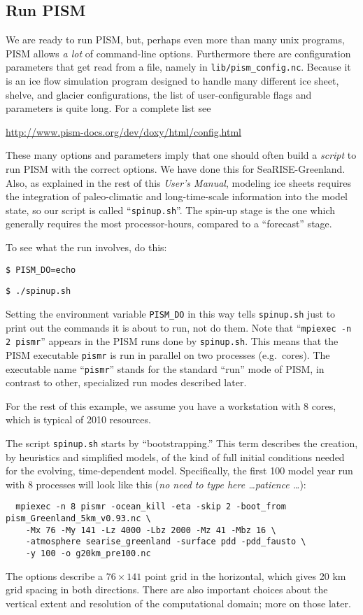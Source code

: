 \subsection{Run PISM}

We are ready to run PISM, but, perhaps even more than many unix programs, PISM allows \emph{a lot} of command-line options.  Furthermore there are configuration parameters that get read from a file, namely in \verb|lib/pism_config.nc|.  Because it is an ice flow simulation program designed to handle many different ice sheet, shelve, and glacier configurations, the list of user-configurable flags and parameters is quite long.  For a complete list see
\begin{center}
\url{http://www.pism-docs.org/dev/doxy/html/config.html}
\end{center}

These many options and parameters imply that one should often build a \emph{script} to run PISM with the correct options.  We have done this for SeaRISE-Greenland.  Also, as explained in the rest of this \emph{User's Manual}, modeling ice sheets requires the integration of paleo-climatic and long-time-scale information into the model state, so our script is called ``\verb|spinup.sh|''.  The spin-up stage is the one which generally requires the most processor-hours, compared to a ``forecast'' stage.

To see what the run involves, do this:

\verb|$ PISM_DO=echo|

\verb|$ ./spinup.sh|

\noindent Setting the environment variable \verb|PISM_DO| in this way tells \verb|spinup.sh| just to print out the commands it is about to run, not do them.  Note that ``\verb|mpiexec -n 2 pismr|'' appears in the PISM runs done by \verb|spinup.sh|.  This means that the PISM executable \verb|pismr| is run in parallel on two processes (e.g.~cores).  The executable name ``\verb|pismr|'' stands for the standard ``run'' mode of PISM, in contrast to other, specialized run modes described later.

For the rest of this example, we assume you have a workstation with 8 cores, which is typical of 2010 resources.

The script \verb|spinup.sh| starts by ``bootstrapping.''  This term describes the creation, by heuristics and simplified models, of the kind of full initial conditions needed for the evolving, time-dependent model.  Specifically, the first 100 model year run with 8 processes will look like this (\emph{no need to type here \dots patience \dots}):
\small
\begin{verbatim}
  mpiexec -n 8 pismr -ocean_kill -eta -skip 2 -boot_from pism_Greenland_5km_v0.93.nc \
    -Mx 76 -My 141 -Lz 4000 -Lbz 2000 -Mz 41 -Mbz 16 \
    -atmosphere searise_greenland -surface pdd -pdd_fausto \
    -y 100 -o g20km_pre100.nc
\end{verbatim}
\normalsize
The options describe a $76\times 141$ point grid in the horizontal, which gives 20 km grid spacing in both directions.  There are also important choices about the vertical extent and resolution of the computational domain; more on those later.  

